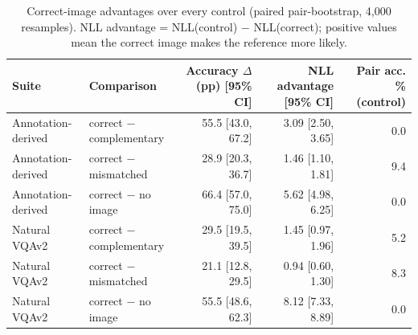 \begin{table}[t]
\centering
\small
\caption{Correct-image advantages over every control (paired pair-bootstrap, 4,000 resamples). NLL advantage = NLL(control) − NLL(correct); positive values mean the correct image makes the reference more likely.}
\label{tab:t2-advantages}
\begin{tabular}{llrrr}
\toprule
Suite & Comparison & Accuracy $\Delta$ (pp) [95\% CI] & NLL advantage [95\% CI] & Pair acc. \% (control) \\
\midrule
Annotation-derived & correct $-$ complementary & 55.5 [43.0, 67.2] & 3.09 [2.50, 3.65] & 0.0 \\
Annotation-derived & correct $-$ mismatched & 28.9 [20.3, 36.7] & 1.46 [1.10, 1.81] & 9.4 \\
Annotation-derived & correct $-$ no image & 66.4 [57.0, 75.0] & 5.62 [4.98, 6.25] & 0.0 \\
Natural VQAv2 & correct $-$ complementary & 29.5 [19.5, 39.5] & 1.45 [0.97, 1.96] & 5.2 \\
Natural VQAv2 & correct $-$ mismatched & 21.1 [12.8, 29.5] & 0.94 [0.60, 1.30] & 8.3 \\
Natural VQAv2 & correct $-$ no image & 55.5 [48.6, 62.3] & 8.12 [7.33, 8.89] & 0.0 \\
\bottomrule
\end{tabular}
\end{table}
